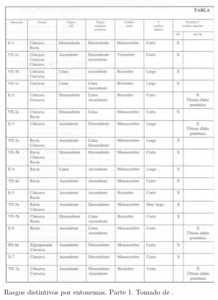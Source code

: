 \begin{figure}
\begin{center}
\includegraphics[width= 1\columnwidth]{Graphics/rasgos_dist1}
\caption{Rasgos distintivos por entonemas. Parte 1. Tomado de \cite[p.218]{garcia1996aspectos2}.}
\label{rasgos_dist1}
\end{center}
\end{figure}


